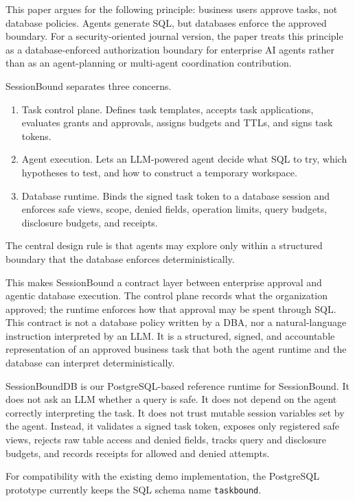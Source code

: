 \documentclass[10pt,twocolumn]{article}
\providecommand{\tightlist}{%
  \setlength{\itemsep}{0pt}\setlength{\parskip}{0pt}}
\begin{document}
This paper argues for the following principle: business users approve
tasks, not database policies. Agents generate SQL, but databases enforce
the approved boundary. For a security-oriented journal version, the
paper treats this principle as a database-enforced authorization
boundary for enterprise AI agents rather than as an agent-planning or
multi-agent coordination contribution.

SessionBound separates three concerns.

\begin{enumerate}
\def\labelenumi{\arabic{enumi}.}
\tightlist
\item
  Task control plane. Defines task templates, accepts task
  applications, evaluates grants and approvals, assigns budgets and
  TTLs, and signs task tokens.
\item
  Agent execution. Lets an LLM-powered agent decide what SQL to
  try, which hypotheses to test, and how to construct a temporary
  workspace.
\item
  Database runtime. Binds the signed task token to a database
  session and enforces safe views, scope, denied fields, operation
  limits, query budgets, disclosure budgets, and receipts.
\end{enumerate}

The central design rule is that agents may explore only within a
structured boundary that the database enforces deterministically.

This makes SessionBound a contract layer between enterprise approval and
agentic database execution. The control plane records what the
organization approved; the runtime enforces how that approval may be
spent through SQL. This contract is not a database policy written by a
DBA, nor a natural-language instruction interpreted by an LLM. It is a
structured, signed, and accountable representation of an approved
business task that both the agent runtime and the database can interpret
deterministically.

SessionBoundDB is our PostgreSQL-based reference runtime for
SessionBound. It does not ask an LLM whether a query is safe. It does
not depend on the agent correctly interpreting the task. It does not
trust mutable session variables set by the agent. Instead, it validates
a signed task token, exposes only registered safe views, rejects raw
table access and denied fields, tracks query and disclosure budgets, and
records receipts for allowed and denied attempts.

For compatibility with the existing demo implementation, the PostgreSQL
prototype currently keeps the SQL schema name \texttt{taskbound}.
\end{document}
